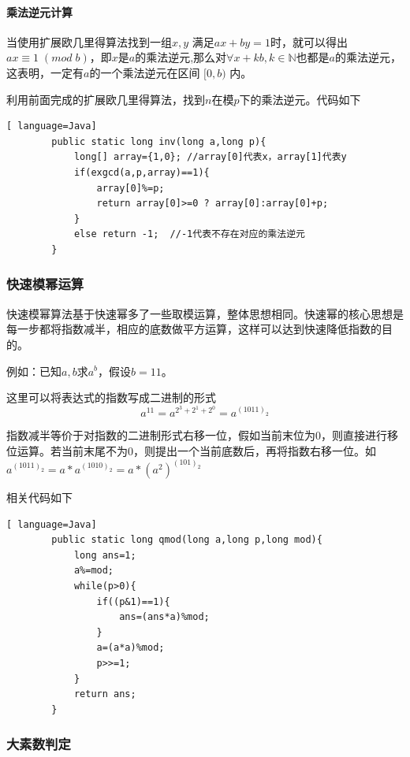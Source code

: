 \documentclass[UTF8,a4paper,10.5pt,twocolumn]{ctexart}
\begin{document}
\paragraph{乘法逆元计算}
	\indent \;
	\par 当使用扩展欧几里得算法找到一组$x,y$ 满足$ax+by=1$时，就可以得出$ax\equiv 1\; (mod\; b)$，即$x$是$a$的乘法逆元,那么对$\forall x+kb,k\in \mathbb{N}$也都是$a$的乘法逆元，这表明，一定有$a$的一个乘法逆元在区间 $[0,b)$ 内。
	\par 利用前面完成的扩展欧几里得算法，找到$n$在模$p$下的乘法逆元。代码如下
	\begin{lstlisting}[ language=Java]
		public static long inv(long a,long p){
	    	long[] array={1,0}; //array[0]代表x，array[1]代表y
	    	if(exgcd(a,p,array)==1){
	        	array[0]%=p;
	        	return array[0]>=0 ? array[0]:array[0]+p;
	    	}
	   		else return -1;  //-1代表不存在对应的乘法逆元
		}
	\end{lstlisting}

\subsubsection{快速模幂运算}
	\par 快速模幂算法基于快速幂多了一些取模运算，整体思想相同。快速幂的核心思想是每一步都将指数减半，相应的底数做平方运算，这样可以达到快速降低指数的目的。
	\par 例如：已知$a,b$求$a^{b}$，假设$b=11$。
	\par 这里可以将表达式的指数写成二进制的形式
	$$
		a^{11}=a^{2^{3}+2^{1}+2^{0}}=a^{(1011)_{2}}
	$$

	\par 指数减半等价于对指数的二进制形式右移一位，假如当前末位为0，则直接进行移位运算。若当前末尾不为0，则提出一个当前底数后，再将指数右移一位。如$a^{(1011)_{2}}=a*a^{(1010)_{2}}=a*(a^{2})^{(101)_{2}}$

	\par 相关代码如下
	\begin{lstlisting}[ language=Java]
		public static long qmod(long a,long p,long mod){
		    long ans=1;
		    a%=mod;
		    while(p>0){
		        if((p&1)==1){ 
		            ans=(ans*a)%mod;
		        }
		        a=(a*a)%mod;
		        p>>=1;
		    }
		    return ans;
		}
	\end{lstlisting}
	
\subsubsection{大素数判定}
\end{document}
